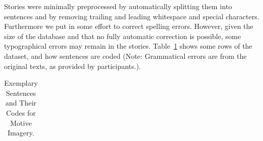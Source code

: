 \documentclass[man,a4paper,mask]{apa6}\usepackage[]{graphicx}\usepackage[]{color}
\begin{document}
Stories were minimally preprocessed by automatically splitting them into sentences and by removing trailing and leading whitespace and special characters. Furthermore we put in some effort to correct spelling errors. However, given the size of the database and that no fully automatic correction is possible, some typographical errors may remain in the stories. Table~\ref{tab:dathead} shows some rows of the dataset, and how sentences are coded (Note: Grammatical errors are from the original texts, as provided by participants.).


\begin{table}
		\caption{Exemplary Sentences and Their Codes for Motive Imagery.}
		\label{tab:dathead}
		\footnotesize
		\begin{tabularx}{\textwidth}{XXrrrl}
		\toprule
		

\end{tabularx}
\end{table}
\end{document}
